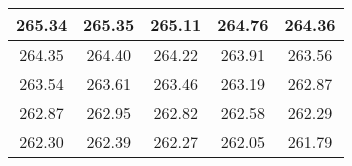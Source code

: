 \begin{large}\begin{tabular}{|c|c|c|c|c|}
\hline
265.34&265.35&265.11&264.76&264.36\\\hline
264.35&264.40&264.22&263.91&263.56\\\hline
263.54&263.61&263.46&263.19&262.87\\\hline
262.87&262.95&262.82&262.58&262.29\\\hline
262.30&262.39&262.27&262.05&261.79\\\hline
\end{tabular}
\end{large}